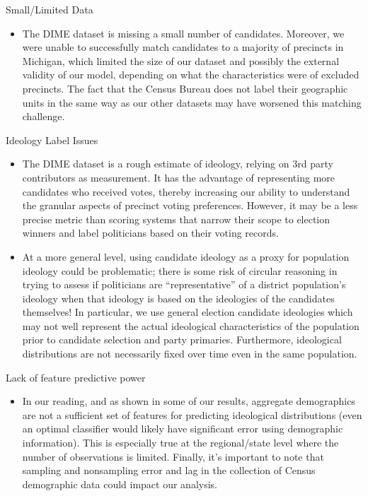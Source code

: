\documentclass{article}
\begin{document}
Small/Limited Data
\begin{itemize}
    \item The DIME dataset is missing a small number of candidates. Moreover, we were unable to successfully match candidates to a majority of precincts in Michigan, which limited the size of our dataset and possibly the external validity of our model, depending on what the characteristics were of excluded precincts. The fact that the Census Bureau does not label their geographic units in the same way as our other datasets may have worsened this matching challenge.
\end{itemize}
Ideology Label Issues
\begin{itemize}
    \item The DIME dataset is a rough estimate of ideology, relying on 3rd party contributors as measurement. It has the advantage of representing more candidates who received votes, thereby increasing our ability to understand the granular aspects of precinct voting preferences. However, it may be a less precise metric than scoring systems that narrow their scope to election winners and label politicians based on their voting records.
    \item At a more general level, using candidate ideology as a proxy for population ideology could be problematic; there is some risk of circular reasoning in trying to assess if politicians are “representative” of a district population’s ideology when that ideology is based on the ideologies of the candidates themselves! In particular, we use general election candidate ideologies which may not well represent the actual ideological characteristics of the population prior to candidate selection and party primaries. Furthermore, ideological distributions are not necessarily fixed over time even in the same population.
\end{itemize}
Lack of feature predictive power
\begin{itemize}
    \item In our reading, and as shown in some of our results, aggregate demographics are not a sufficient set of features for predicting ideological distributions (even an optimal classifier would likely have significant error using demographic information). This is especially true at the regional/state level where the number of observations is limited. Finally, it’s important to note that sampling and nonsampling error and lag in the collection of Census demographic data could impact our analysis.
\end{itemize}
\end{document}
